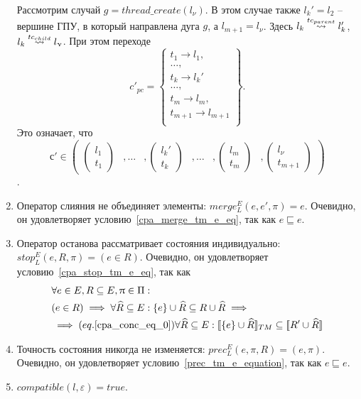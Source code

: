\begin{enumerate}
Рассмотрим случай $g = thread\_create(l_\nu)$. В этом случае также $l_k' = l_2$ -- вершине ГПУ, в который направлена дуга $g$, а $l_{m+1} = l_\nu$. Здесь $l_k \stackrel{tc_{parent}}{\leadsto} l_k'$, $l_k \stackrel{tc_{child}}{\leadsto} l_\upnu$. При этом переходе $$ c'_{pc} = 
\left\lbrace
\begin{array}{c}
t_1 \to l_1,\\
\dots,\\
t_k \to l_k'\\
\dots,\\
t_m \to l_m,\\
t_{m+1} \to l_{m+1}\\
\end{array}
\right\rbrace.$$ Это означает, что $$ с' \in \begin{pmatrix}
\begin{pmatrix}
l_1 \\
t_1 
\end{pmatrix}& ,
\dots& ,
\begin{pmatrix}
l_k' \\
t_k 
\end{pmatrix}& ,
\dots& ,
\begin{pmatrix}
l_m \\
t_m 
\end{pmatrix}& ,
\begin{pmatrix}
l_\nu \\
t_{m+1} 
\end{pmatrix}
\end{pmatrix}$$.


\item Оператор слияния не объединяет элементы: $merge^E_L(e, e', \pi) = e$. Очевидно, он удовлетворяет условию~\ref{cpa_merge_tm_e_eq}, так как $e \sqsubseteq e$.

\item Оператор останова рассматривает состояния индивидуально: $stop^E_L(e, R, \pi) = (e \in R)$. Очевидно, он удовлетворяет условию~\ref{cpa_stop_tm_e_eq}, так как
\begin{align}
&\forall e \in E, R \subseteq E, \uppi \in \Pi: \nonumber \\
& (e \in R) \implies \forall \widehat{R} \subseteq E: \{e\} \cup \widehat{R} \subseteq R \cup \widehat{R} \implies \nonumber \\
& \implies (eq.\ref{cpa_conc_eq_0}) \forall \widehat{R} \subseteq E: [\![ \{e\}\cup \widehat{R} ]\!]_{TM} \subseteq [\![ R' \cup \widehat{R} ]\!]
\end{align}

\item Точность состояния никогда не изменяется: $prec^E_L(e, \pi, R) = (e, \pi)$.
Очевидно, он удовлетворяет условию~\ref{prec_tm_e_equation}, так как $e \sqsubseteq e$.

\item $compatible(l,\varepsilon) = true$.

\end{enumerate}

